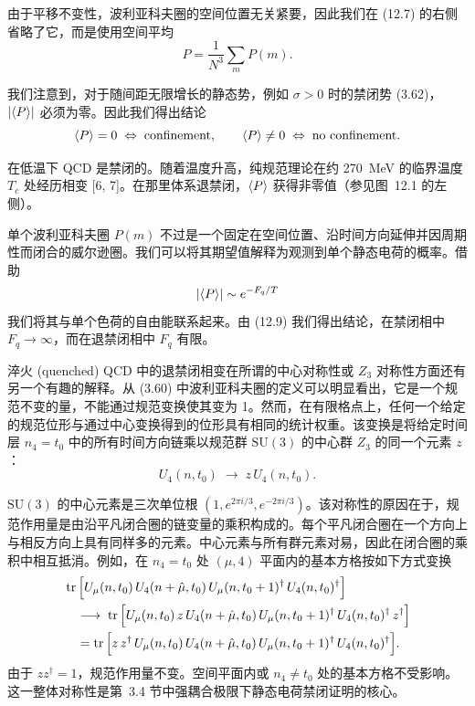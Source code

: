 由于平移不变性，波利亚科夫圈的空间位置无关紧要，因此我们在 (12.7) 的右侧省略了它，而是使用空间平均
\begin{equation}
  P = \frac{1}{N^3}\sum_m P(m).
\end{equation}

我们注意到，对于随间距无限增长的静态势，例如 $\sigma > 0$ 时的禁闭势 (3.62)，$\left|\left\langle P \right\rangle\right|$ 必须为零。因此我们得出结论
\begin{equation}
  \left\langle P \right\rangle = 0 \;\Leftrightarrow\; \text{confinement},
  \qquad
  \left\langle P \right\rangle \ne 0 \;\Leftrightarrow\; \text{no confinement}.
\end{equation}

在低温下 QCD 是禁闭的。随着温度升高，纯规范理论在约 270~MeV 的临界温度 $T_c$ 处经历相变 [6, 7]。在那里体系退禁闭，$\left\langle P \right\rangle$ 获得非零值（参见图~12.1 的左侧）。

单个波利亚科夫圈 $P(m)$ 不过是一个固定在空间位置、沿时间方向延伸并因周期性而闭合的威尔逊圈。我们可以将其期望值解释为观测到单个静态电荷的概率。借助
\begin{equation}
  \left|\left\langle P \right\rangle\right| \sim e^{-F_q/T}
\end{equation}
我们将其与单个色荷的自由能联系起来。由 (12.9) 我们得出结论，在禁闭相中 $F_q \to \infty$，而在退禁闭相中 $F_q$ 有限。

淬火 (quenched) QCD 中的退禁闭相变在所谓的中心对称性或 $Z_3$ 对称性方面还有另一个有趣的解释。从 (3.60) 中波利亚科夫圈的定义可以明显看出，它是一个规范不变的量，不能通过规范变换使其变为 1。然而，在有限格点上，任何一个给定的规范位形与通过中心变换得到的位形具有相同的统计权重。该变换是将给定时间层 $n_4 = t_0$ 中的所有时间方向链乘以规范群 $\mathrm{SU}(3)$ 的中心群 $Z_3$ 的同一个元素 $z$：
\begin{equation}
  U_4(n,t_0) \;\to\; z\,U_4(n,t_0).
\end{equation}

$\mathrm{SU}(3)$ 的中心元素是三次单位根 $(1, e^{2\pi i/3}, e^{-2\pi i/3})$。该对称性的原因在于，规范作用量是由沿平凡闭合圈的链变量的乘积构成的。每个平凡闭合圈在一个方向上与相反方向上具有同样多的元素。中心元素与所有群元素对易，因此在闭合圈的乘积中相互抵消。例如，在 $n_4 = t_0$ 处 $(\mu,4)$ 平面内的基本方格按如下方式变换
\begin{equation}
\begin{split}
  &\operatorname{tr}\Big[U_\mu(n,t_0)\,U_4(n+\hat{\mu},t_0)\,U_\mu(n,t_0+1)^\dagger\,
    U_4(n,t_0)^\dagger\Big] \\
  &\quad\longrightarrow\;
  \operatorname{tr}\Big[U_\mu(n,t_0)\,z\,U_4(n+\hat{\mu},t_0)\,U_\mu(n,t_0+1)^\dagger\,
    U_4(n,t_0)^\dagger\,z^\dagger\Big] \\
  &\quad= \operatorname{tr}\Big[z\,z^\dagger\,U_\mu(n,t_0)\,U_4(n+\hat{\mu},t_0)\,
    U_\mu(n,t_0+1)^\dagger\,U_4(n,t_0)^\dagger\Big].
\end{split}
\end{equation}
由于 $zz^\dagger = 1$，规范作用量不变。空间平面内或 $n_4 \ne t_0$ 处的基本方格不受影响。这一整体对称性是第~3.4 节中强耦合极限下静态电荷禁闭证明的核心。

